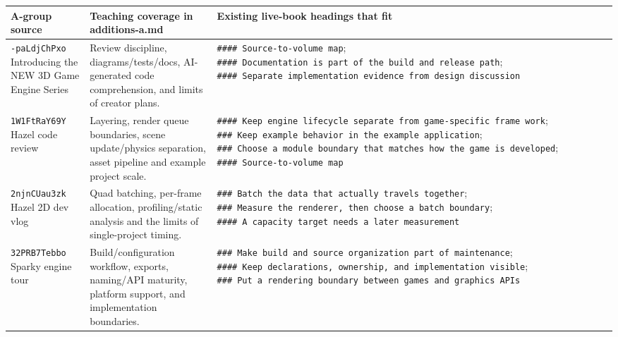 {\def\LTcaptype{none} %
\begin{longtable}[]{@{}
  >{\raggedright\arraybackslash}p{}
  >{\raggedright\arraybackslash}p{}
  >{\raggedright\arraybackslash}p{}@{}}
\toprule\noalign{}
\begin{minipage}[b]{\linewidth}\raggedright
A-group source
\end{minipage} & \begin{minipage}[b]{\linewidth}\raggedright
Teaching coverage in additions-a.md
\end{minipage} & \begin{minipage}[b]{\linewidth}\raggedright
Existing live-book headings that fit
\end{minipage} \\
\midrule\noalign{}
\endhead
\bottomrule\noalign{}
\endlastfoot
\texttt{-paLdjChPxo} Introducing the NEW 3D Game Engine Series & Review discipline, diagrams/tests/docs, AI-generated code comprehension, and limits of creator plans. & \texttt{\#\#\#\#\ Source-to-volume\ map}; \texttt{\#\#\#\#\ Documentation\ is\ part\ of\ the\ build\ and\ release\ path}; \texttt{\#\#\#\#\ Separate\ implementation\ evidence\ from\ design\ discussion} \\
\texttt{1W1FtRaY69Y} Hazel code review & Layering, render queue boundaries, scene update/physics separation, asset pipeline and example project scale. & \texttt{\#\#\#\#\ Keep\ engine\ lifecycle\ separate\ from\ game-specific\ frame\ work}; \texttt{\#\#\#\ Keep\ example\ behavior\ in\ the\ example\ application}; \texttt{\#\#\#\ Choose\ a\ module\ boundary\ that\ matches\ how\ the\ game\ is\ developed}; \texttt{\#\#\#\#\ Source-to-volume\ map} \\
\texttt{2njnCUau3zk} Hazel 2D dev vlog & Quad batching, per-frame allocation, profiling/static analysis and the limits of single-project timing. & \texttt{\#\#\#\ Batch\ the\ data\ that\ actually\ travels\ together}; \texttt{\#\#\#\ Measure\ the\ renderer,\ then\ choose\ a\ batch\ boundary}; \texttt{\#\#\#\#\ A\ capacity\ target\ needs\ a\ later\ measurement} \\
\texttt{32PRB7Tebbo} Sparky engine tour & Build/configuration workflow, exports, naming/API maturity, platform support, and implementation boundaries. & \texttt{\#\#\#\ Make\ build\ and\ source\ organization\ part\ of\ maintenance}; \texttt{\#\#\#\#\ Keep\ declarations,\ ownership,\ and\ implementation\ visible}; \texttt{\#\#\#\ Put\ a\ rendering\ boundary\ between\ games\ and\ graphics\ APIs} \\

\end{longtable}}
